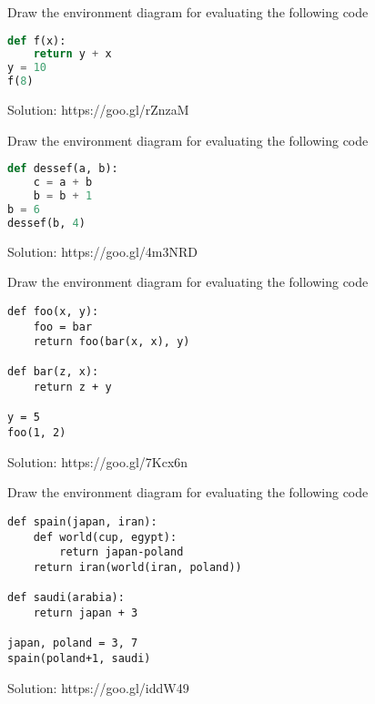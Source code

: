 \question
Draw the environment diagram for evaluating the following code
\begin{lstlisting}[language=Python]
def f(x):
    return y + x
y = 10
f(8)
\end{lstlisting}
\begin{solution}[3in]
Solution: https://goo.gl/rZnzaM
\end{solution}
\question
Draw the environment diagram for evaluating the following code
\begin{lstlisting}[language=Python]
def dessef(a, b):
	c = a + b
	b = b + 1
b = 6
dessef(b, 4)
\end{lstlisting}

\begin{solution}[.1in]
Solution: https://goo.gl/4m3NRD
\end{solution}
\newpage
\question
Draw the environment diagram for evaluating the following code
\begin{lstlisting}
def foo(x, y):
	foo = bar
	return foo(bar(x, x), y)
	
def bar(z, x):
	return z + y
	
y = 5
foo(1, 2)
\end{lstlisting}
\begin{solution}[2.5in]
Solution: 	https://goo.gl/7Kcx6n
\end{solution}

\question
Draw the environment diagram for evaluating the following code
\begin{lstlisting}
def spain(japan, iran):
	def world(cup, egypt):
		return japan-poland
	return iran(world(iran, poland))

def saudi(arabia):
	return japan + 3
	
japan, poland = 3, 7
spain(poland+1, saudi)
\end{lstlisting}
\begin{solution}
Solution: 	https://goo.gl/iddW49
\end{solution}


